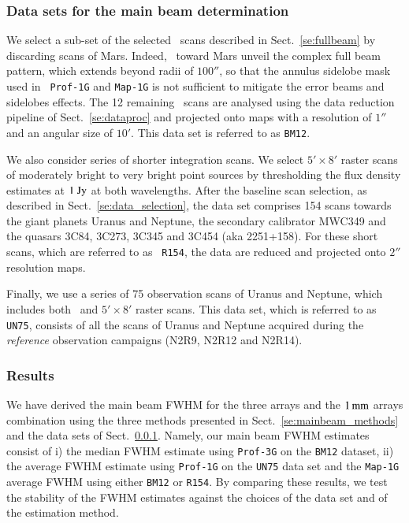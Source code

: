 \subsubsection{Data sets for the main beam determination}
\label{se:mainbeam_dataset}

We select a sub-set of the selected \bm\ scans described in
Sect.~\ref{se:fullbeam} by discarding scans of Mars. {\lp Indeed, \bms\
toward Mars unveil the complex full beam pattern, which extends beyond
radii of $100''$, so that the annulus sidelobe mask used in {\tt
Prof-1G} and {\tt Map-1G} is not sufficient to mitigate the error
beams and sidelobes effects.}
The 12 remaining \bm\ scans are analysed using the data reduction
pipeline of Sect.~\ref{se:dataproc} and projected onto maps
with a resolution of $1''$ and an angular size of $10'$. This data set
is referred to as {\tt BM12}.

We also consider series of shorter integration scans. We select
$5' \times 8'$ raster scans of moderately bright to very bright point
sources by thresholding the flux density estimates at $1~\rm{Jy}$ at both
wavelengths. %
After the baseline scan selection, as described in
Sect.~\ref{se:data_selection}, the data set comprises 154 %
scans towards the giant planets Uranus and Neptune, the secondary calibrator
MWC349 and the quasars 3C84, 3C273, 3C345 and 3C454 (aka
2251+158). For these short scans, which are referred to as {\tt
R154}, the data are reduced and projected onto $2''$
resolution maps. 

{\lp Finally, we use a series of 75 observation scans of Uranus and
Neptune, which includes both \bm\ and $5' \times 8'$ raster scans. 
This data set, which is referred to as {\tt UN75}, consists of all the
scans of Uranus and Neptune acquired during the \emph{reference}
observation campaigns (N2R9, N2R12 and N2R14).}


\subsubsection{Results}
\label{se:mainbeam_results}

We have derived the main beam FWHM for the three arrays and the
$1\,\rm{mm}$ arrays combination using the three methods presented in
Sect.~\ref{se:mainbeam_methods} and the data
sets of Sect.~\ref{se:mainbeam_dataset}.
Namely, our main beam FWHM estimates
consist of i) the median FWHM estimate using {\tt Prof-3G} on the
{\tt BM12} dataset, ii) the average FWHM estimate using {\tt Prof-1G}
on the {\tt UN75} data set and the {\tt Map-1G} average FWHM using
either {\tt BM12} or {\tt R154}. 
By comparing these results, we test the stability of the FWHM
estimates against the choices of the data set and of the estimation
method. %

